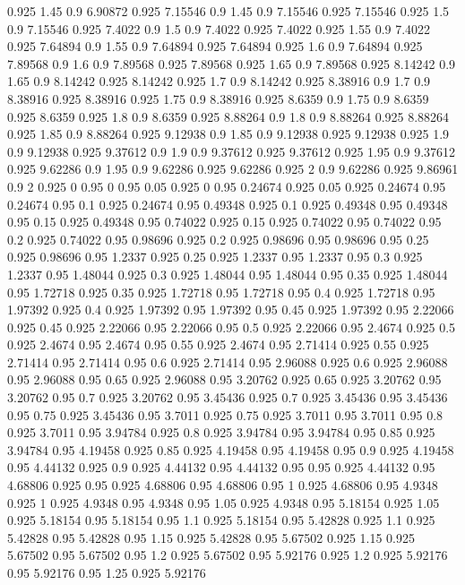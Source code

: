 0.925 1.45
0.9 6.90872
0.925 7.15546
0.9 1.45
0.9 7.15546
0.925 7.15546
0.925 1.5
0.9 7.15546
0.925 7.4022
0.9 1.5
0.9 7.4022
0.925 7.4022
0.925 1.55
0.9 7.4022
0.925 7.64894
0.9 1.55
0.9 7.64894
0.925 7.64894
0.925 1.6
0.9 7.64894
0.925 7.89568
0.9 1.6
0.9 7.89568
0.925 7.89568
0.925 1.65
0.9 7.89568
0.925 8.14242
0.9 1.65
0.9 8.14242
0.925 8.14242
0.925 1.7
0.9 8.14242
0.925 8.38916
0.9 1.7
0.9 8.38916
0.925 8.38916
0.925 1.75
0.9 8.38916
0.925 8.6359
0.9 1.75
0.9 8.6359
0.925 8.6359
0.925 1.8
0.9 8.6359
0.925 8.88264
0.9 1.8
0.9 8.88264
0.925 8.88264
0.925 1.85
0.9 8.88264
0.925 9.12938
0.9 1.85
0.9 9.12938
0.925 9.12938
0.925 1.9
0.9 9.12938
0.925 9.37612
0.9 1.9
0.9 9.37612
0.925 9.37612
0.925 1.95
0.9 9.37612
0.925 9.62286
0.9 1.95
0.9 9.62286
0.925 9.62286
0.925 2
0.9 9.62286
0.925 9.86961
0.9 2
0.925 0
0.95 0
0.95 0.05
0.925 0
0.95 0.24674
0.925 0.05
0.925 0.24674
0.95 0.24674
0.95 0.1
0.925 0.24674
0.95 0.49348
0.925 0.1
0.925 0.49348
0.95 0.49348
0.95 0.15
0.925 0.49348
0.95 0.74022
0.925 0.15
0.925 0.74022
0.95 0.74022
0.95 0.2
0.925 0.74022
0.95 0.98696
0.925 0.2
0.925 0.98696
0.95 0.98696
0.95 0.25
0.925 0.98696
0.95 1.2337
0.925 0.25
0.925 1.2337
0.95 1.2337
0.95 0.3
0.925 1.2337
0.95 1.48044
0.925 0.3
0.925 1.48044
0.95 1.48044
0.95 0.35
0.925 1.48044
0.95 1.72718
0.925 0.35
0.925 1.72718
0.95 1.72718
0.95 0.4
0.925 1.72718
0.95 1.97392
0.925 0.4
0.925 1.97392
0.95 1.97392
0.95 0.45
0.925 1.97392
0.95 2.22066
0.925 0.45
0.925 2.22066
0.95 2.22066
0.95 0.5
0.925 2.22066
0.95 2.4674
0.925 0.5
0.925 2.4674
0.95 2.4674
0.95 0.55
0.925 2.4674
0.95 2.71414
0.925 0.55
0.925 2.71414
0.95 2.71414
0.95 0.6
0.925 2.71414
0.95 2.96088
0.925 0.6
0.925 2.96088
0.95 2.96088
0.95 0.65
0.925 2.96088
0.95 3.20762
0.925 0.65
0.925 3.20762
0.95 3.20762
0.95 0.7
0.925 3.20762
0.95 3.45436
0.925 0.7
0.925 3.45436
0.95 3.45436
0.95 0.75
0.925 3.45436
0.95 3.7011
0.925 0.75
0.925 3.7011
0.95 3.7011
0.95 0.8
0.925 3.7011
0.95 3.94784
0.925 0.8
0.925 3.94784
0.95 3.94784
0.95 0.85
0.925 3.94784
0.95 4.19458
0.925 0.85
0.925 4.19458
0.95 4.19458
0.95 0.9
0.925 4.19458
0.95 4.44132
0.925 0.9
0.925 4.44132
0.95 4.44132
0.95 0.95
0.925 4.44132
0.95 4.68806
0.925 0.95
0.925 4.68806
0.95 4.68806
0.95 1
0.925 4.68806
0.95 4.9348
0.925 1
0.925 4.9348
0.95 4.9348
0.95 1.05
0.925 4.9348
0.95 5.18154
0.925 1.05
0.925 5.18154
0.95 5.18154
0.95 1.1
0.925 5.18154
0.95 5.42828
0.925 1.1
0.925 5.42828
0.95 5.42828
0.95 1.15
0.925 5.42828
0.95 5.67502
0.925 1.15
0.925 5.67502
0.95 5.67502
0.95 1.2
0.925 5.67502
0.95 5.92176
0.925 1.2
0.925 5.92176
0.95 5.92176
0.95 1.25
0.925 5.92176
